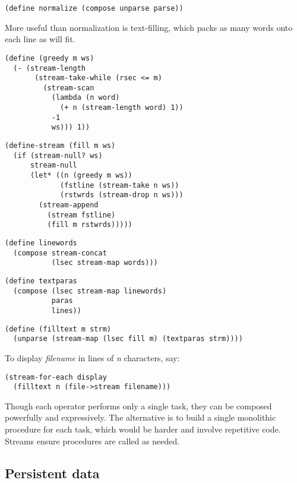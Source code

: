 \begin{verbatim}
(define normalize (compose unparse parse))
\end{verbatim}

More useful than normalization is text-filling, which packs as many
words onto each line as will fit.

\begin{verbatim}
(define (greedy m ws)
  (- (stream-length
       (stream-take-while (rsec <= m)
         (stream-scan
           (lambda (n word)
             (+ n (stream-length word) 1))
           -1
           ws))) 1))
\end{verbatim}

\begin{verbatim}
(define-stream (fill m ws)
  (if (stream-null? ws)
      stream-null
      (let* ((n (greedy m ws))
             (fstline (stream-take n ws))
             (rstwrds (stream-drop n ws)))
        (stream-append
          (stream fstline)
          (fill m rstwrds)))))
\end{verbatim}

\begin{verbatim}
(define linewords
  (compose stream-concat
           (lsec stream-map words)))
\end{verbatim}

\begin{verbatim}
(define textparas
  (compose (lsec stream-map linewords)
           paras
           lines))
\end{verbatim}

\begin{verbatim}
(define (filltext m strm)
  (unparse (stream-map (lsec fill m) (textparas strm))))
\end{verbatim}

To display \emph{filename} in lines of \emph{n} characters, say:

\begin{verbatim}
(stream-for-each display
  (filltext n (file->stream filename)))
\end{verbatim}

Though each operator performs only a single task, they can be composed
powerfully and expressively. The alternative is to build a single
monolithic procedure for each task, which would be harder and involve
repetitive code. Streams ensure procedures are called as needed.

\subsection{Persistent data}\label{persistent-data}

